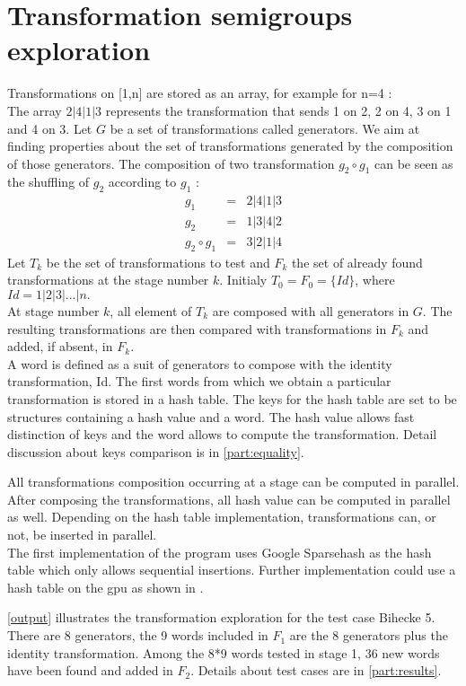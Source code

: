 {\section{Transformation semigroups exploration}
\label{note}
Transformations on [1,n] are stored as an array, for example for n=4 :\\
The array $2|4|1|3$ represents the transformation that sends 1 on 2, 2 on 4, 3 on 1 and 4 on 3.
Let $G$ be a set of transformations called generators. We aim at finding properties about the set of transformations generated by the composition of those generators.
The composition of two transformation $g_2\circ g_1$ can be seen as the shuffling of $g_2$ according to $g_1$ :
\begin{eqnarray*}
g_1 &=& 2|4|1|3\\
g_2 &=& 1|3|4|2\\
g_2\circ g_1 &=& 3|2|1|4
\end{eqnarray*}
Let $T_k$ be the set of transformations to test and $F_k$ the set of already found transformations at the stage number $k$. Initialy $T_0 = F_0 = \{Id\}$, where $Id = 1|2|3|...|n.$\\
At stage number $k$, all element of $T_k$ are composed with all generators in $G$. 
The resulting transformations are then compared with transformations in $F_k$ and added, if absent, in $F_k$.\\ 
A word is defined as a suit of generators to compose with the identity transformation, Id.
The first words from which we obtain a particular transformation is stored in a hash table.
The keys for the hash table are set to be structures containing a hash value and a word. 
The hash value allows fast distinction of keys and the word allows to compute the transformation. Detail discussion about keys comparison is in \autoref{part:equality}.

All transformations composition occurring at a stage can be computed in parallel. After composing the transformations, all hash value can be computed in parallel as well. 
Depending on the hash table implementation, transformations can, or not, be inserted in parallel.\\
The first implementation of the program uses Google Sparsehash \cite{sparsehash} as the hash table which only allows sequential insertions. 
Further implementation could use a hash table on the \gls{gpu} as shown in \cite{wen2011gpu}.

\autoref{output} illustrates the transformation exploration for the test case Bihecke 5. 
There are 8 generators, the 9 words included in $F_1$ are the 8 generators plus the identity transformation. 
Among the 8*9 words tested in stage 1, 36 new words have been found and added in $F_2$.
Details about test cases are in \autoref{part:results}.

}
